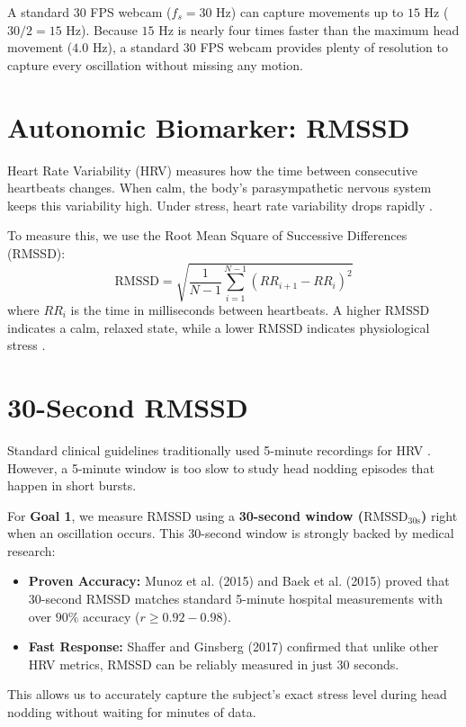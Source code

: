 \documentclass[12pt,a4paper,oneside]{report}
\begin{document}
A standard 30 FPS webcam ($f_s = 30\text{ Hz}$) can capture movements up to $15\text{ Hz}$ ($30 / 2 = 15\text{ Hz}$). Because $15\text{ Hz}$ is nearly four times faster than the maximum head movement ($4.0\text{ Hz}$), a standard 30 FPS webcam provides plenty of resolution to capture every oscillation without missing any motion.

\section{Autonomic Biomarker: RMSSD}
Heart Rate Variability (HRV) measures how the time between consecutive heartbeats changes. When calm, the body's parasympathetic nervous system keeps this variability high. Under stress, heart rate variability drops rapidly \cite{kim2018}. 

To measure this, we use the Root Mean Square of Successive Differences (RMSSD):
\begin{equation}
    \text{RMSSD} = \sqrt{\frac{1}{N-1} \sum_{i=1}^{N-1} (RR_{i+1} - RR_i)^2}
\end{equation}
where $RR_i$ is the time in milliseconds between heartbeats. A higher RMSSD indicates a calm, relaxed state, while a lower RMSSD indicates physiological stress \cite{shaffer2017}.

\section{30-Second RMSSD}
Standard clinical guidelines traditionally used 5-minute recordings for HRV \cite{taskforce1996}. However, a 5-minute window is too slow to study head nodding episodes that happen in short bursts.

For \textbf{Goal 1}, we measure RMSSD using a \textbf{30-second window ($\text{RMSSD}_{\text{30s}}$)} right when an oscillation occurs. This 30-second window is strongly backed by medical research:
\begin{itemize}[leftmargin=1.2cm]
    \item \textbf{Proven Accuracy:} Munoz et al. (2015) \cite{munoz2015} and Baek et al. (2015) \cite{baek2015} proved that 30-second RMSSD matches standard 5-minute hospital measurements with over $90\%$ accuracy ($r \ge 0.92 - 0.98$).
    \item \textbf{Fast Response:} Shaffer and Ginsberg (2017) \cite{shaffer2017} confirmed that unlike other HRV metrics, RMSSD can be reliably measured in just 30 seconds.
\end{itemize}
This allows us to accurately capture the subject's exact stress level during head nodding without waiting for minutes of data.
\end{document}
